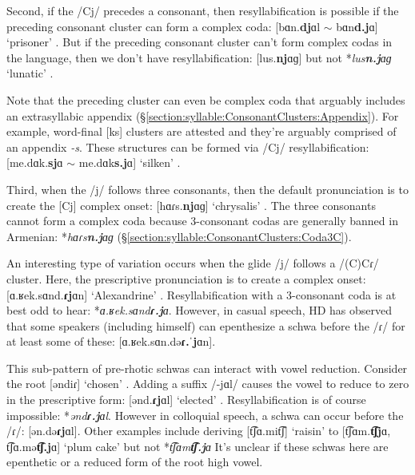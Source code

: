 	Second, if the /Cj/ precedes a consonant, then resyllabification is possible if the preceding consonant cluster can form a complex coda: [bɑn.\textbf{dj}ɑl $\sim$ bɑn\textbf{d.j}ɑ] `prisoner' . But if the preceding consonant cluster can't form complex codas in the language, then we don't have resyllabification: [lus.\textbf{nj}ɑɡ] but not *\textit{lus\textbf{n.j}ɑɡ} `lunatic' . 
	
	Note that the preceding cluster can even be complex coda that   arguably includes an  extrasyllabic appendix (\S\ref{section:syllable:ConsonantClusters:Appendix}). For example, word-final [ks] clusters are attested and they're arguably comprised of an appendix \textit{-s}. These structures can be formed via /Cj/ resyllabification: [me.dɑk.\textbf{sj}ɑ $\sim$ me.dɑk\textbf{s.j}ɑ] `silken' . 
	
	Third, when the /j/ follows three consonants, then the default pronunciation is to create the [Cj] complex onset: [hɑɾs.\textbf{nj}ɑɡ] `chrysalis' . The three consonants cannot form a complex coda because 3-consonant codas are generally banned in Armenian: *\textit{hɑɾs\textbf{n.j}ɑɡ} (\S\ref{section:syllable:ConsonantClusters:Coda3C}). 
	
	
	An interesting type of variation occurs when the glide /j/ follows a /(C)Cɾ/ cluster. Here, the prescriptive pronunciation is to create a complex onset: [ɑ.ʁek.sɑnd.\textbf{ɾj}ɑn] `Alexandrine' . Resyllabification with a 3-consonant coda is at best odd to hear: *\textit{ɑ.ʁek.sɑnd\textbf{ɾ.j}ɑ}. However, in casual speech, HD has observed that some speakers (including himself) can epenthesize a schwa before the /ɾ/ for at least some of these: [ɑ.ʁek.sɑn.də\textbf{ɾ.ˈj}ɑn]. 
	
	
	
	This sub-pattern of pre-rhotic schwas can interact  with vowel reduction. Consider the root [əndiɾ] `chosen' . Adding a suffix /-jɑl/ causes the vowel to reduce to zero in the prescriptive form:    [ənd.\textbf{ɾj}ɑl] `elected' . Resyllabification is of course impossible: *\textit{ənd\textbf{ɾ.j}ɑl}. However in colloquial speech, a schwa can occur before the /ɾ/: [ən.də\textbf{ɾj}ɑl]. Other examples include  deriving [t͡ʃɑ.mit͡ʃ] `raisin'  to [t͡ʃɑm.\textbf{t͡ʃj}ɑ, t͡ʃɑ.mə\textbf{t͡ʃ.j}ɑ] `plum cake'   but not *\textit{t͡ʃɑm\textbf{t͡ʃ.j}ɑ} It's unclear if these schwas here are  epenthetic or a reduced form of the root high vowel.   
	
